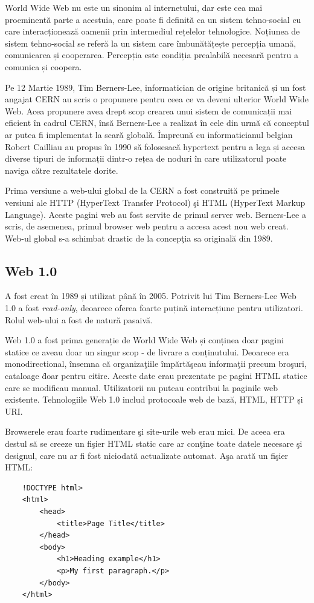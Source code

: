 \documentclass[12pt, a4paper]{report}
\begin{document}
World Wide Web nu este un sinonim al internetului, dar este cea mai proeminentă parte a acestuia, care poate fi definită ca un sistem tehno-social cu care interacționează oamenii prin intermediul rețelelor tehnologice. Noțiunea de sistem tehno-social se referă la un sistem care îmbunătățește percepția umană, comunicarea și cooperarea. Percepția este condiția prealabilă necesară pentru a comunica și coopera. \cite{theoreticalfundationsoftheweb}

Pe 12 Martie 1989, Tim Berners-Lee, informatician de origine britanică și un fost angajat CERN au scris o propunere pentru ceea ce va deveni ulterior World Wide Web. Acea propunere avea drept scop crearea unui sistem de comunicații mai eficient în cadrul CERN, însă Berners-Lee a realizat în cele din urmă că conceptul ar putea fi implementat la scară globală. Împreună cu informaticianul belgian Robert Cailliau au propus în 1990 să folosesacă hypertext pentru a lega și accesa diverse tipuri de informații dintr-o rețea de noduri în care utilizatorul poate naviga către rezultatele dorite.

Prima versiune a web-ului global de la CERN a fost construit\u a pe primele versiuni ale HTTP (HyperText Transfer Protocol) \c si HTML (HyperText Markup Language). Aceste pagini web au fost servite de primul server web. Berners-Lee a scris, de asemenea, primul browser web pentru a accesa acest nou web creat. Web-ul global s-a schimbat drastic de la concep\c tia sa original\u a din 1989.

\subsection{Web 1.0}

A fost creat în 1989 și utilizat până în 2005. Potrivit lui Tim Berners-Lee Web 1.0 a fost \emph{read-only}, deoarece oferea foarte puțină interacțiune pentru utilizatori. Rolul web-ului a fost de natură pasaivă.

Web 1.0 a fost prima generație de World Wide Web și conținea doar pagini statice ce aveau doar un singur scop - de livrare a conținutului. Deoarece era monodirectional, \^ insemna c\u a organiza\c tiile \^ imp\u art\u a\c seau informa\c tii precum bro\c suri, cataloage \^ doar pentru citire. Aceste date erau prezentate pe pagini HTML statice care se modificau manual. Utilizatorii nu puteau contribui la paginile web existente. Tehnologiile Web 1.0 includ protocoale web de bază, HTML, HTTP și URI.

Browserele erau foarte rudimentare \c si site-urile web erau mici. De aceea era destul s\u a se creeze un fi\c sier HTML static care ar con\c tine toate datele necesare \c si designul, care nu ar fi fost niciodat\u a actualizate automat. A\c sa arat\u a un fi\c sier HTML:
\begin{lstlisting}
	!DOCTYPE html>
	<html>
		<head>
			<title>Page Title</title>
		</head>
		<body>
			<h1>Heading example</h1>
			<p>My first paragraph.</p>
		</body>
	</html>
\end{lstlisting}
\end{document}
